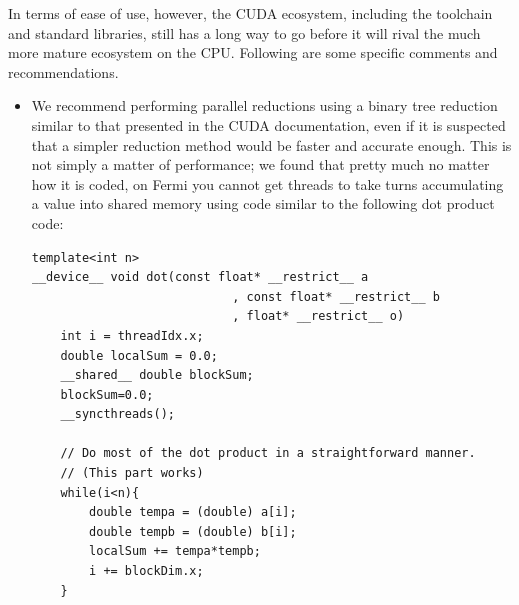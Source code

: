 In terms of ease of use, however, the CUDA ecosystem, including the toolchain
and standard libraries, still has a long way to go before it will rival the
much more mature ecosystem on the CPU.  
Following are some
specific comments and recommendations.
\begin{itemize}
\item We recommend performing parallel reductions using a binary tree
reduction similar to that presented in the CUDA documentation, 
even if it is suspected that a simpler reduction method would be faster and accurate enough.  
This is not simply a matter of performance; we found that pretty much no matter how
it is coded, on Fermi you cannot get threads to take turns accumulating a value into 
shared memory using code similar to the following dot product code:
\begin{verbatim}
template<int n>
__device__ void dot(const float* __restrict__ a
							, const float* __restrict__ b
							, float* __restrict__ o)
	int i = threadIdx.x;
	double localSum = 0.0;
	__shared__ double blockSum;
	blockSum=0.0;
	__syncthreads();

	// Do most of the dot product in a straightforward manner. 
	// (This part works)
	while(i<n){
		double tempa = (double) a[i];
		double tempb = (double) b[i];
		localSum += tempa*tempb;
		i += blockDim.x;
	}


\end{verbatim}
\end{itemize}

